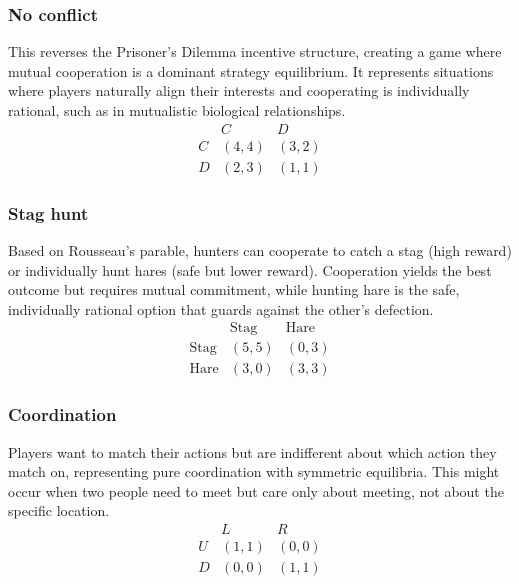 \documentclass[11pt]{amsart}
\begin{document}

\subsubsection{No conflict}

This reverses the Prisoner's Dilemma incentive structure, creating a game where mutual cooperation is a dominant strategy equilibrium. It represents situations where players naturally align their interests and cooperating is individually rational, such as in mutualistic biological relationships.
\[
\begin{array}{c|c|c}
  & C & D \\
\hline
C & (4, 4) & (3, 2) \\
\hline
D & (2, 3) & (1, 1)
\end{array}
\]

\subsubsection{Stag hunt}

Based on Rousseau's parable, hunters can cooperate to catch a stag (high reward) or individually hunt hares (safe but lower reward). Cooperation yields the best outcome but requires mutual commitment, while hunting hare is the safe, individually rational option that guards against the other's defection.
\[
\begin{array}{c|c|c}
  & \text{Stag} & \text{Hare} \\
\hline
\text{Stag} & (5, 5) & (0, 3) \\
\hline
\text{Hare} & (3, 0) & (3, 3)
\end{array}
\]

\subsubsection{Coordination}

Players want to match their actions but are indifferent about which action they match on, representing pure coordination with symmetric equilibria. This might occur when two people need to meet but care only about meeting, not about the specific location.
\[
\begin{array}{c|c|c}
  & L & R \\
\hline
U & (1, 1) & (0, 0) \\
\hline
D & (0, 0) & (1, 1)
\end{array}
\]
\end{document}

